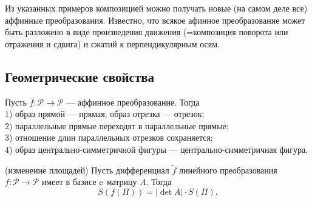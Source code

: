 
Из указанных примеров композицией можно получать новые (на самом деле все) аффинные преобразования.
Известно, что всякое афинное преобразование может быть разложено 
в виде произведения движения (=композиция поворота или отражения и сдвига) и сжатий к перпендикулярным осям.


\subsection{Геометрические свойства}



\begin{predl}\label{p4_3_1}
Пусть $f: \mathcal{P}\to \mathcal{P}$ --- аффинное преобразование. Тогда\\
1) образ прямой --- прямая, образ отрезка --- отрезок;\\
2) параллельные прямые переходят в параллельные прямые;\\
3) отношение длин параллельных отрезков сохраняется;\\
4) образ центрально-симметричной фигуры --- центрально-симметричная фигура.
\end{predl}



\begin{theor}\label{t4_2_1}(изменение площадей)
Пусть 
дифференциал $\widetilde{f}$ линейного преобразования $f: \mathcal{P} \to \mathcal{P}$ 
имеет в базисе $\mathrm{e}$ матрицу $A$. 
Тогда \\ 
$$\boxed{S(f(\Pi )) = |\det A| \cdot S(\Pi ) }.$$
\end{theor}


